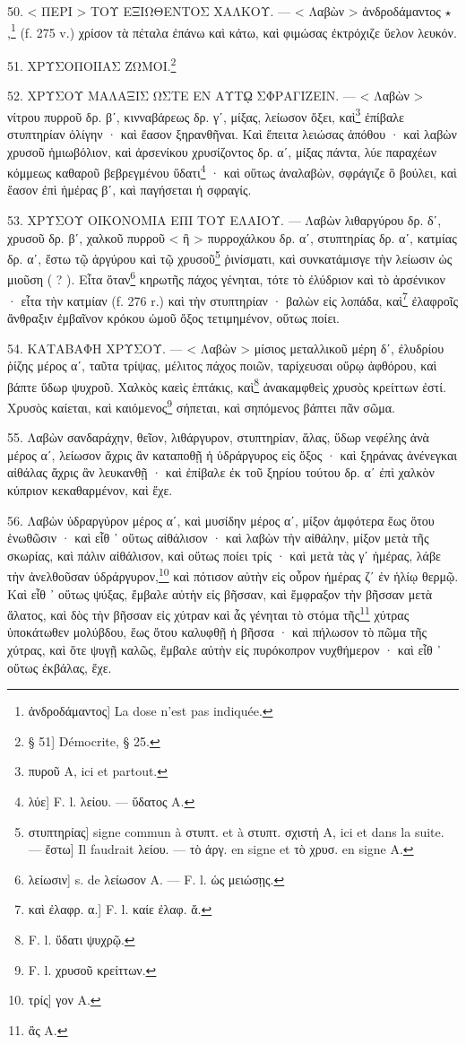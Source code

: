 \documentclass[a4paper, 11pt, oneside, polutonikogreek, french]{article}
\begin{document}
50. < ΠΕΡΙ > ΤΟΥ ΕΞΙΩΘΕΝΤΟΣ ΧΑΛΚΟΥ. --- < Λαβὼν > ἀνδροδάμαντος $\star$,\footnote{ἀνδροδάμαντος] La dose n'est pas indiquée.} (f. 275 v.) χρίσον τὰ πέταλα ἐπάνω καὶ κάτω, καὶ φιμώσας ἐκτρόχιζε ὕελον λευκόν.

51. ΧΡΥΣΟΠΟΙΙΑΣ ΖΩΜΟΙ.\footnote{§ 51] Démocrite, § 25.}

52. ΧΡΥΣΟΥ ΜΑΛΑΞΙΣ ΩΣΤΕ ΕΝ ΑΥΤῼ ΣΦΡΑΓΙΖΕΙΝ. --- < Λαβὼν > νίτρου πυρροῦ δρ. βʹ, κινναβάρεως δρ. γʹ, μίξας, λείωσον ὄξει, καὶ\footnote{πυροῦ A, ici et partout.} ἐπίβαλε στυπτηρίαν ὀλίγην · καὶ ἔασον ξηρανθῆναι. Καὶ ἔπειτα λειώσας ἀπόθου · καὶ λαβὼν χρυσοῦ ἡμιωβόλιον, καὶ ἀρσενίκου χρυσίζοντος δρ. αʹ, μίξας πάντα, λύε παραχέων κόμμεως καθαροῦ βεβρεγμένου ὕδατι\footnote{λύε] F. l. λείου. --- ὕδατος A.} · καὶ οὕτως ἀναλαβὼν, σφράγιζε ὃ βούλει, καὶ ἔασον ἐπὶ ἡμέρας βʹ, καὶ παγήσεται ἡ σφραγίς.

53. ΧΡΥΣΟΥ ΟΙΚΟΝΟΜΙΑ ΕΠΙ ΤΟΥ ΕΛΑΙΟΥ. --- Λαβὼν λιθαργύρου δρ. δʹ, χρυσοῦ δρ. βʹ, χαλκοῦ πυρροῦ < ἢ > πυρροχάλκου δρ. αʹ, στυπτηρίας δρ. αʹ, κατμίας δρ. αʹ, ἔστω τῷ ἀργύρου καὶ τῷ χρυσοῦ\footnote{στυπτηρίας] signe commun à στυπτ. et à στυπτ. σχιστή A, ici et dans la suite. --- ἔστω] Il faudrait λείου. --- τὸ ἀργ. en signe et τὸ χρυσ. en signe A.} ῥινίσματι, καὶ συνκατάμισγε τὴν λείωσιν ὡς μιοῦση ( ? ). Εἶτα ὅταν\footnote{λείωσιν] s. de λείωσον A. --- F. l. ὡς μειώσῃς.} κηρωτῆς πάχος γένηται, τότε τὸ ἐλύδριον καὶ τὸ ἀρσένικον · εἶτα τὴν κατμίαν (f. 276 r.) καὶ τὴν στυπτηρίαν · βαλὼν εἰς λοπάδα, καὶ\footnote{καὶ ἐλαφρ. α.] F. l. καίε ἐλαφ. ἄ.} ἐλαφροῖς ἄνθραξιν ἐμβαῖνον κρόκου ὠμοῦ ὄξος τετιμημένον, οὕτως ποίει.

54. ΚΑΤΑΒΑΦΗ ΧΡΥΣΟΥ. --- < Λαβὼν > μίσιος μεταλλικοῦ μέρη δʹ, ἐλυδρίου ῥίζης μέρος αʹ, ταῦτα τρίψας, μέλιτος πάχος ποιῶν, ταρίχευσαι οὔρῳ ἀφθόρου, καὶ βάπτε ὕδωρ ψυχροῦ. Χαλκὸς καεὶς ἑπτάκις, καὶ\footnote{F. l. ὕδατι ψυχρῷ.} ἀνακαμφθεὶς χρυσὸς κρείττων ἐστί. Χρυσὸς καίεται, καὶ καιόμενος\footnote{F. l. χρυσοῦ κρείττων.} σήπεται, καὶ σηπόμενος βάπτει πᾶν σῶμα.

55. Λαβὼν σανδαράχην, θεῖον, λιθάργυρον, στυπτηρίαν, ἅλας, ὕδωρ νεφέλης ἀνὰ μέρος αʹ, λείωσον ἄχρις ἂν καταποθῇ ἡ ὑδράργυρος εἰς ὄξος · καὶ ξηράνας ἀνένεγκαι αἰθάλας ἄχρις ἂν λευκανθῇ · καὶ ἐπίβαλε ἐκ τοῦ ξηρίου τούτου δρ. αʹ ἐπὶ χαλκὸν κύπριον κεκαθαρμένον, καὶ ἔχε.

56. Λαβὼν ὑδραργύρον μέρος αʹ, καὶ μυσίδην μέρος αʹ, μίξον ἀμφότερα ἕως ὅτου ἑνωθῶσιν · καὶ εἶθ ᾽ οὕτως αἰθάλισον · καὶ λαβὼν τὴν αἰθάλην, μίξον μετὰ τῆς σκωρίας, καὶ πάλιν αἰθάλισον, καὶ οὕτως ποίει τρίς · καὶ μετὰ τὰς γʹ ἡμέρας, λάβε τὴν ἀνελθοῦσαν ὑδράργυρον,\footnote{τρίς] γον A.} καὶ πότισον αὐτὴν εἰς οὖρον ἡμέρας ζʹ ἐν ἡλίῳ θερμῷ. Καὶ εἶθ ᾽ οὕτως ψύξας, ἔμβαλε αὐτὴν εἰς βῆσσαν, καὶ ἔμφραξον τὴν βῆσσαν μετὰ ἅλατος, καὶ δὸς τὴν βῆσσαν εἰς χύτραν καὶ ἇς γένηται τὸ στόμα τῆς\footnote{ἂς A.} χύτρας ὑποκάτωθεν μολύβδου, ἕως ὅτου καλυφθῇ ἡ βῆσσα · καὶ πήλωσον τὸ πῶμα τῆς χύτρας, καὶ ὅτε ψυγῇ καλῶς, ἔμβαλε αὐτὴν εἰς πυρόκοπρον νυχθήμερον · καὶ εἶθ ᾽ οὕτως ἐκβάλας, ἔχε.
\end{document}
